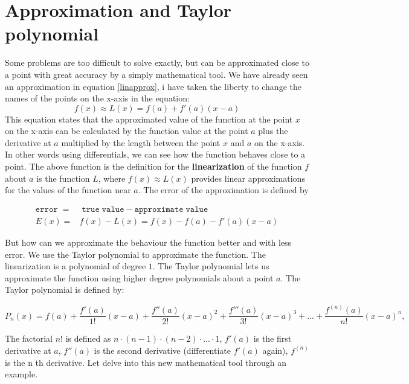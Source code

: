 \documentclass[main.tex]{subfiles}
\begin{document}
\section{Approximation and Taylor polynomial}

Some problems are too difficult to solve exactly, but can be approximated close to a point with great accuracy by a simply mathematical tool. We have already seen an approximation in equation \ref{linapprox}, i have taken the liberty to change the names of the points on the x-axis in the equation: 
\begin{equation}
f(x) \approx L(x) = f(a) + f'(a)(x-a)
\end{equation}
This equation states that the approximated value of the function at the point $x$ on the x-axis can be calculated by the function value at the point $a$ plus the derivative at $a$ multiplied by the length between the point $x$ and $a$ on the x-axis. In other words using differentials, we can see how the function behaves close to a point. The above function is the definition for the \textbf{linearization} of the function $f$ about $a$ is the function $L$, where $f(x) \approx L(x)$ provides linear approximations for the values of the function near $a$. The error of the approximation is defined by

\begin{align}
\mathtt{error} \; =& \; \mathtt{true \; value} - \mathtt{approximate \; value} \\
E(x) =& f(x) - L(x) = f(x) - f(a) - f'(a)(x-a)
\end{align}

But how can we approximate the behaviour the function better and with less error. We use the Taylor polynomial to approximate the function. The linearization is a polynomial of degree $1$. The Taylor polynomial lets us approximate the function using higher degree polynomials about a point $a$. The Taylor polynomial is defined by:

\begin{equation}
P_n(x) = f(a) + \frac{f'(a)}{1!}(x-a) + \frac{f''(a)}{2!}(x-a)^2 + \frac{f'''(a)}{3!}(x-a)^3 + ... + \frac{f^{(n)}(a)}{n!}(x-a)^n,
\end{equation}      

The factorial $n!$ is defined as $n \cdot (n-1) \cdot (n-2) \cdot ... \cdot 1$, $f'(a)$ is the first derivative at $a$, $f''(a)$ is the second derivative (differentiate $f'(a)$ again), $f^{(n)}$ is the n th derivative. Let delve into this new mathematical tool through an example.
\end{document}
